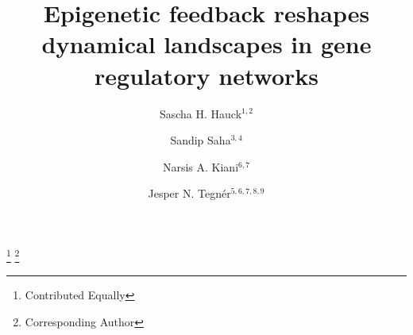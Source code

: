 \documentclass[reprint,amsmath,amssymb,aps]{revtex4-2}
\begin{document}
\title{Epigenetic feedback reshapes dynamical landscapes in gene regulatory networks}

\author{Sascha H. Hauck$^{1,2}$}

\author{Sandip Saha$^{3,4}$}
\thanks{Contributed Equally}
\thanks{Corresponding Author}

\author{Narsis A. Kiani$^{6,7}$} 

\author{Jesper N. Tegn\'er$^{5,6,7,8,9}$} 

\address{$^1$Department of Flow and Material Simulation, Fraunhofer ITWM, Kaiserslautern, 67663 Germany}
\address{$^2$Chair for Scientific Computing, University of Kaiserslautern-Landau (RPTU), 67663 Germany}
\address{$^3$National Centre for Biological Sciences-Tata Institute of Fundamental Research, Bengaluru 560065, India}
\address{$^4$Biological and Environmental Science and Engineering Division, King Abdullah University of Science and Technology, Thuwal, 23955, Saudi Arabia}
\address{$^5$Division of Biomedical Sciences, King Abdullah University of Science and Technology, Thuwal, 23955, Saudi Arabia}
\address{$^6$Unit of Computational Medicine, Center for Molecular Medicine, Karolinska Institutet, Karolinska University Hospital, Stockholm, 171 76, Sweden}
\address{$^7$Algorithmic Dynamics Lab, Department of Oncology and Pathology, Karolinska Institute, Stockholm, 171 64, Sweden}
\address{$^8$Computer, Electrical and Mathematical Sciences and Engineering Division, King Abdullah University of Science and Technology, Thuwal, 23955, Saudi Arabia}
\address{$^9$Science for Life Laboratory, Solna, 171 65, Sweden}
\end{document}
